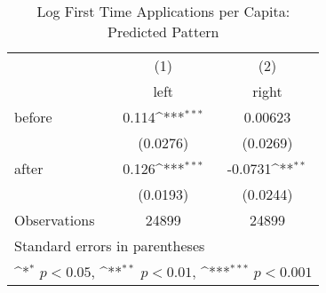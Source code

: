 \begin{table}[htbp]\centering
\def\sym#1{\ifmmode^{#1}\else\(^{#1}\)\fi}
\caption{Log First Time Applications per Capita: Predicted Pattern}
\begin{tabular}{l*{2}{c}}
\hline\hline
                    &\multicolumn{1}{c}{(1)}&\multicolumn{1}{c}{(2)}\\
                    &\multicolumn{1}{c}{left}&\multicolumn{1}{c}{right}\\
\hline
before              &       0.114\sym{***}&     0.00623         \\
                    &    (0.0276)         &    (0.0269)         \\
[1em]
after               &       0.126\sym{***}&     -0.0731\sym{**} \\
                    &    (0.0193)         &    (0.0244)         \\
\hline
Observations        &       24899         &       24899         \\
\hline\hline
\multicolumn{3}{l}{\footnotesize Standard errors in parentheses}\\
\multicolumn{3}{l}{\footnotesize \sym{*} \(p<0.05\), \sym{**} \(p<0.01\), \sym{***} \(p<0.001\)}\\
\end{tabular}
\end{table}
